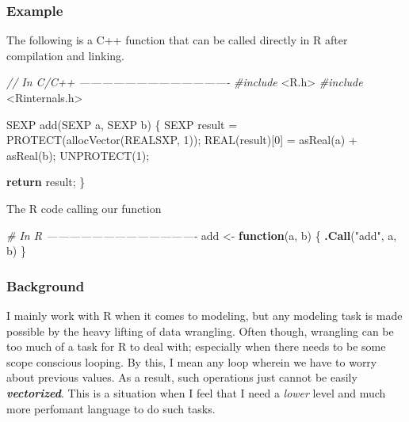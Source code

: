 \documentclass[]{article}
\newenvironment{Shaded}{\begin{snugshade}}{\end{snugshade}}
\newcommand{\KeywordTok}[1]{\textcolor[rgb]{0.13,0.29,0.53}{\textbf{#1}}}
\newcommand{\DecValTok}[1]{\textcolor[rgb]{0.00,0.00,0.81}{#1}}
\newcommand{\StringTok}[1]{\textcolor[rgb]{0.31,0.60,0.02}{#1}}
\newcommand{\ImportTok}[1]{#1}
\newcommand{\CommentTok}[1]{\textcolor[rgb]{0.56,0.35,0.01}{\textit{#1}}}
\newcommand{\ControlFlowTok}[1]{\textcolor[rgb]{0.13,0.29,0.53}{\textbf{#1}}}
\newcommand{\PreprocessorTok}[1]{\textcolor[rgb]{0.56,0.35,0.01}{\textit{#1}}}
\newcommand{\NormalTok}[1]{#1}
\begin{document}
\newpage

\subsubsection{Example}\label{example}

The following is a C++ function that can be called directly in R after
compilation and linking.

\begin{Shaded}
\begin{Highlighting}[]
\CommentTok{// In C/C++ ----------------------------------------}
\PreprocessorTok{#include }\ImportTok{<R.h>}
\PreprocessorTok{#include }\ImportTok{<Rinternals.h>}

\NormalTok{SEXP add(SEXP a, SEXP b) \{}
\NormalTok{  SEXP result = PROTECT(allocVector(REALSXP, }\DecValTok{1}\NormalTok{));}
\NormalTok{  REAL(result)[}\DecValTok{0}\NormalTok{] = asReal(a) + asReal(b);}
\NormalTok{  UNPROTECT(}\DecValTok{1}\NormalTok{);}

  \ControlFlowTok{return}\NormalTok{ result;}
\NormalTok{\}}
\end{Highlighting}
\end{Shaded}

The R code calling our function

\begin{Shaded}
\begin{Highlighting}[]
\CommentTok{# In R ----------------------------------------}
\NormalTok{add <-}\StringTok{ }\ControlFlowTok{function}\NormalTok{(a, b) \{}
  \KeywordTok{.Call}\NormalTok{(}\StringTok{"add"}\NormalTok{, a, b)}
\NormalTok{\}}
\end{Highlighting}
\end{Shaded}

\newpage

\subsubsection{Background}\label{background}

I mainly work with R when it comes to modeling, but any modeling task is
made possible by the heavy lifting of data wrangling. Often though,
wrangling can be too much of a task for R to deal with; especially when
there needs to be some scope conscious looping. By this, I mean any loop
wherein we have to worry about previous values. As a result, such
operations just cannot be easily \textbf{\emph{vectorized}}. This is a
situation when I feel that I need a \emph{lower} level and much more
perfomant language to do such tasks.
\end{document}
